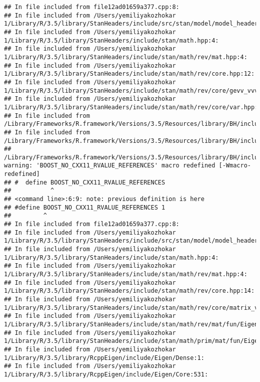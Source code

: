 \documentclass[]{article}
\begin{document}
\begin{verbatim}
## In file included from file12ad01659a377.cpp:8:
## In file included from /Users/yemiliyakozhokar 1/Library/R/3.5/library/StanHeaders/include/src/stan/model/model_header.hpp:4:
## In file included from /Users/yemiliyakozhokar 1/Library/R/3.5/library/StanHeaders/include/stan/math.hpp:4:
## In file included from /Users/yemiliyakozhokar 1/Library/R/3.5/library/StanHeaders/include/stan/math/rev/mat.hpp:4:
## In file included from /Users/yemiliyakozhokar 1/Library/R/3.5/library/StanHeaders/include/stan/math/rev/core.hpp:12:
## In file included from /Users/yemiliyakozhokar 1/Library/R/3.5/library/StanHeaders/include/stan/math/rev/core/gevv_vvv_vari.hpp:5:
## In file included from /Users/yemiliyakozhokar 1/Library/R/3.5/library/StanHeaders/include/stan/math/rev/core/var.hpp:7:
## In file included from /Library/Frameworks/R.framework/Versions/3.5/Resources/library/BH/include/boost/math/tools/config.hpp:13:
## In file included from /Library/Frameworks/R.framework/Versions/3.5/Resources/library/BH/include/boost/config.hpp:39:
## /Library/Frameworks/R.framework/Versions/3.5/Resources/library/BH/include/boost/config/compiler/clang.hpp:200:11: warning: 'BOOST_NO_CXX11_RVALUE_REFERENCES' macro redefined [-Wmacro-redefined]
## #  define BOOST_NO_CXX11_RVALUE_REFERENCES
##           ^
## <command line>:6:9: note: previous definition is here
## #define BOOST_NO_CXX11_RVALUE_REFERENCES 1
##         ^
## In file included from file12ad01659a377.cpp:8:
## In file included from /Users/yemiliyakozhokar 1/Library/R/3.5/library/StanHeaders/include/src/stan/model/model_header.hpp:4:
## In file included from /Users/yemiliyakozhokar 1/Library/R/3.5/library/StanHeaders/include/stan/math.hpp:4:
## In file included from /Users/yemiliyakozhokar 1/Library/R/3.5/library/StanHeaders/include/stan/math/rev/mat.hpp:4:
## In file included from /Users/yemiliyakozhokar 1/Library/R/3.5/library/StanHeaders/include/stan/math/rev/core.hpp:14:
## In file included from /Users/yemiliyakozhokar 1/Library/R/3.5/library/StanHeaders/include/stan/math/rev/core/matrix_vari.hpp:4:
## In file included from /Users/yemiliyakozhokar 1/Library/R/3.5/library/StanHeaders/include/stan/math/rev/mat/fun/Eigen_NumTraits.hpp:4:
## In file included from /Users/yemiliyakozhokar 1/Library/R/3.5/library/StanHeaders/include/stan/math/prim/mat/fun/Eigen.hpp:4:
## In file included from /Users/yemiliyakozhokar 1/Library/R/3.5/library/RcppEigen/include/Eigen/Dense:1:
## In file included from /Users/yemiliyakozhokar 1/Library/R/3.5/library/RcppEigen/include/Eigen/Core:531:

\end{verbatim}
\end{document}
